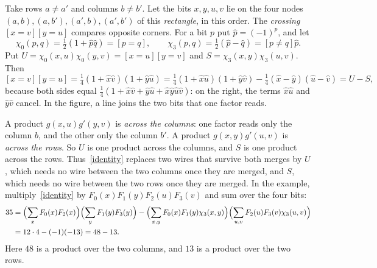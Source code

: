 \documentclass[11pt]{article}
\begin{document}
Take rows $a\ne a'$ and columns $b\ne b'$. Let the bits $x,y,u,v$ lie on the four nodes $(a,b),(a,b'),(a',b),(a',b')$ of this \emph{rectangle}, in this order. The \emph{crossing} $[x=v][y=u]$ compares opposite corners. For a bit $p$ put $\hat p=(-1)^p$, and let
\[
\chi_0(p,q)=\tfrac12(1+\hat p\hat q)=[p=q],\qquad\chi_3(p,q)=\tfrac12(\hat p-\hat q)=[p\ne q]\hat p.
\]
Put $U=\chi_0(x,u)\chi_0(y,v)=[x=u][y=v]$ and $S=\chi_3(x,y)\chi_3(u,v)$. Then
\begin{equation}\label{identity}
[x=v][y=u]=\tfrac14(1+\hat x\hat v)(1+\hat y\hat u)=\tfrac14(1+\hat x\hat u)(1+\hat y\hat v)-\tfrac14(\hat x-\hat y)(\hat u-\hat v)=U-S,
\end{equation}
because both sides equal $\tfrac14(1+\hat x\hat v+\hat y\hat u+\hat x\hat y\hat u\hat v)$: on the right, the terms $\hat x\hat u$ and $\hat y\hat v$ cancel. In the figure, a line joins the two bits that one factor reads.

\begin{center}
\end{center}

A product $g(x,u)g'(y,v)$ is \emph{across the columns}: one factor reads only the column $b$, and the other only the column $b'$. A product $g(x,y)g'(u,v)$ is \emph{across the rows}. So $U$ is one product across the columns, and $S$ is one product across the rows. Thus~\eqref{identity} replaces two wires that survive both merges by $U$, which needs no wire between the two columns once they are merged, and $S$, which needs no wire between the two rows once they are merged. In the example, multiply~\eqref{identity} by $F_0(x)F_1(y)F_2(u)F_3(v)$ and sum over the four bits:
\begin{align*}
35&=\Bigl(\sum_xF_0(x)F_2(x)\Bigr)\Bigl(\sum_yF_1(y)F_3(y)\Bigr)-\Bigl(\sum_{x,y}F_0(x)F_1(y)\chi_3(x,y)\Bigr)\Bigl(\sum_{u,v}F_2(u)F_3(v)\chi_3(u,v)\Bigr)\\
&=12\cdot4-(-1)(-13)=48-13.
\end{align*}
Here $48$ is a product over the two columns, and $13$ is a product over the two rows.
\end{document}
